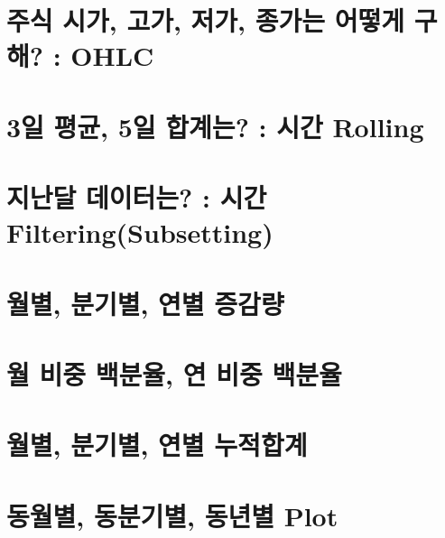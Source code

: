 \documentclass[
]{book}
\begin{document}
\hypertarget{uxc8fcuxc2dd-uxc2dcuxac00-uxace0uxac00-uxc800uxac00-uxc885uxac00uxb294-uxc5b4uxb5bbuxac8c-uxad6cuxd574-ohlc}{%
\section{주식 시가, 고가, 저가, 종가는 어떻게 구해? : OHLC}\label{uxc8fcuxc2dd-uxc2dcuxac00-uxace0uxac00-uxc800uxac00-uxc885uxac00uxb294-uxc5b4uxb5bbuxac8c-uxad6cuxd574-ohlc}}

\hypertarget{uxc77c-uxd3c9uxade0-5uxc77c-uxd569uxacc4uxb294-uxc2dcuxac04-rolling}{%
\section{3일 평균, 5일 합계는? : 시간 Rolling}\label{uxc77c-uxd3c9uxade0-5uxc77c-uxd569uxacc4uxb294-uxc2dcuxac04-rolling}}

\hypertarget{uxc9c0uxb09cuxb2ec-uxb370uxc774uxd130uxb294-uxc2dcuxac04-filteringsubsetting}{%
\section{지난달 데이터는? : 시간 Filtering(Subsetting)}\label{uxc9c0uxb09cuxb2ec-uxb370uxc774uxd130uxb294-uxc2dcuxac04-filteringsubsetting}}

\hypertarget{uxc6d4uxbcc4-uxbd84uxae30uxbcc4-uxc5f0uxbcc4-uxc99duxac10uxb7c9}{%
\section{월별, 분기별, 연별 증감량}\label{uxc6d4uxbcc4-uxbd84uxae30uxbcc4-uxc5f0uxbcc4-uxc99duxac10uxb7c9}}

\hypertarget{uxc6d4-uxbe44uxc911-uxbc31uxbd84uxc728-uxc5f0-uxbe44uxc911-uxbc31uxbd84uxc728}{%
\section{월 비중 백분율, 연 비중 백분율}\label{uxc6d4-uxbe44uxc911-uxbc31uxbd84uxc728-uxc5f0-uxbe44uxc911-uxbc31uxbd84uxc728}}

\hypertarget{uxc6d4uxbcc4-uxbd84uxae30uxbcc4-uxc5f0uxbcc4-uxb204uxc801uxd569uxacc4}{%
\section{월별, 분기별, 연별 누적합계}\label{uxc6d4uxbcc4-uxbd84uxae30uxbcc4-uxc5f0uxbcc4-uxb204uxc801uxd569uxacc4}}

\hypertarget{uxb3d9uxc6d4uxbcc4-uxb3d9uxbd84uxae30uxbcc4-uxb3d9uxb144uxbcc4-plot}{%
\section{동월별, 동분기별, 동년별 Plot}\label{uxb3d9uxc6d4uxbcc4-uxb3d9uxbd84uxae30uxbcc4-uxb3d9uxb144uxbcc4-plot}}
\end{document}
